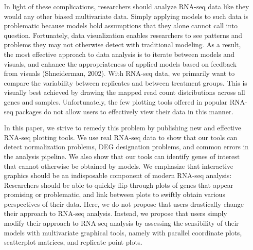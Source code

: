 \documentclass[11pt] {article}
\begin{document}
In light of these complications, researchers should analyze RNA-seq data like they would any other biased multivariate data. Simply applying models to such data is problematic because models hold assumptions that they alone cannot call into question. Fortunately, data visualization enables researchers to see patterns and problems they may not otherwise detect with traditional modeling. As a result, the most effective approach to data analysis is to iterate between models and visuals, and enhance the appropriateness of applied models based on feedback from visuals (Shneiderman, 2002). With RNA-seq data, we primarily want to compare the variability between replicates and between treatment groups. This is visually best achieved by drawing the mapped read count distributions across all genes and samples. Unfortunately, the few plotting tools offered in popular RNA-seq packages do not allow users to effectively view their data in this manner.

In this paper, we strive to remedy this problem by publishing new and effective RNA-seq plotting tools. We use real RNA-seq data to show that our tools can detect normalization problems, DEG designation problems, and common errors in the analysis pipeline. We also show that our tools can identify genes of interest that cannot otherwise be obtained by models. We emphasize that interactive graphics should be an indisposable component of modern RNA-seq analysis: Researchers should be able to quickly flip through plots of genes that appear promising or problematic, and link between plots to swiftly obtain various perspectives of their data. Here, we do not propose that users drastically change their approach to RNA-seq analysis. Instead, we propose that users simply modify their approach to RNA-seq analysis by assessing the sensibility of their models with multivariate graphical tools, namely with parallel coordinate plots, scatterplot matrices, and replicate point plots.
\end{document}
